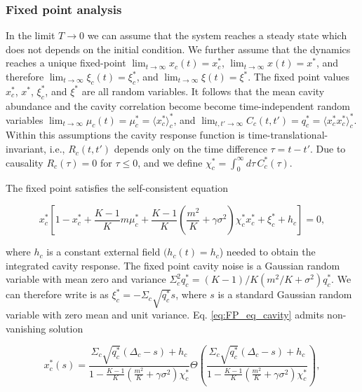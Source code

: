 \documentclass[
    preprint,
    linenumbers,
    amsmath,amssymb,amsfonts,
    aps, physrev,
    superscriptaddress,
    10pt,
    bibnotes
    ]{revtex4-2}
\begin{document}
\subsubsection{\label{subsec:FP_analysis_RRG}Fixed point analysis}

In the limit $T\to0$ we can assume that the system reaches a steady
state which does not depends on the initial condition. We further
assume that the dynamics reaches a unique fixed-point $\lim_{t\to\infty}x_{c}(t)=x_{c}^{*}$,
$\lim_{t\to\infty}x(t)=x^{*}$, and therefore $\lim_{t\to\infty}\xi_{c}(t)=\xi_{c}^{*}$,
and $\lim_{t\to\infty}\xi(t)=\xi^{*}$. The fixed point values $x_{c}^{*}$,
$x^{*}$, $\xi_{c}^{*}$, and $\xi^{*}$ are all random variables.
It follows that the mean cavity abundance and the cavity correlation
become become time-independent random variables $\lim_{t\to\infty}\mu_{c}(t)=\mu_{c}^{*}=\langle x_{c}^{*}\rangle_{c}^{*}$,
and $\lim_{t,t'\to\infty}C_{c}(t,t')=q_{c}^{*}=\langle x_{c}^{*}x_{c}^{*}\rangle_{c}^{*}.$
Within this assumptions the cavity response function is time-translational-invariant,
i.e., $R_{c}(t,t')$ depends only on the time difference $\tau=t-t'$.
Due to causality $R_{c}(\tau)=0$ for $\tau\leq0$, and we define
$\chi_{c}^{*}=\int_{0}^{\infty}d\tau\,C_{c}^{*}(\tau)$. 

The fixed point satisfies the self-consistent equation 

\begin{equation}
x_{c}^{*}\left[1-x_{c}^{*}+\frac{K-1}{K}m\mu_{c}^{*}+\frac{K-1}{K}\left(\frac{m^{2}}{K}+\gamma\sigma^{2}\right)\chi_{c}^{*}x_{c}^{*}+\xi_{c}^{*}+h_{c}\right]=0,\label{eq:FP_eq_cavity}
\end{equation}

where $h_{c}$ is a constant external field $(h_{c}(t)=h_{c}$) needed
to obtain the integrated cavity response. The fixed point cavity noise is a Gaussian random variable with mean zero and variance $\Sigma_c^2q_c^*=(K-1)/K(m^2/K+\sigma^2)q_c^*$. We can therefore write is as $\xi_c^*=-\Sigma_c\sqrt{q_c^*}s$, where $s$ is a standard Gaussian random variable with zero mean and unit variance. Eq. \eqref{eq:FP_eq_cavity}
admits non-vanishing solution

\begin{equation}
x_{c}^{*}\left(s\right)=\frac{\Sigma_{c}\sqrt{q_{c}^{*}}(\Delta_c-s)+h_{c}}{1-\frac{K-1}{K}\left(\frac{m^{2}}{K}+\gamma\sigma^{2}\right)\chi_{c}^{*}}\Theta\left(\frac{\Sigma_{c}\sqrt{q_{c}^{*}}(\Delta_c-s)+h_{c}}{1-\frac{K-1}{K}\left(\frac{m^{2}}{K}+\gamma\sigma^{2}\right)\chi_{c}^{*}}\right),\label{eq:FP_sol_cavity}
\end{equation}
\end{document}
